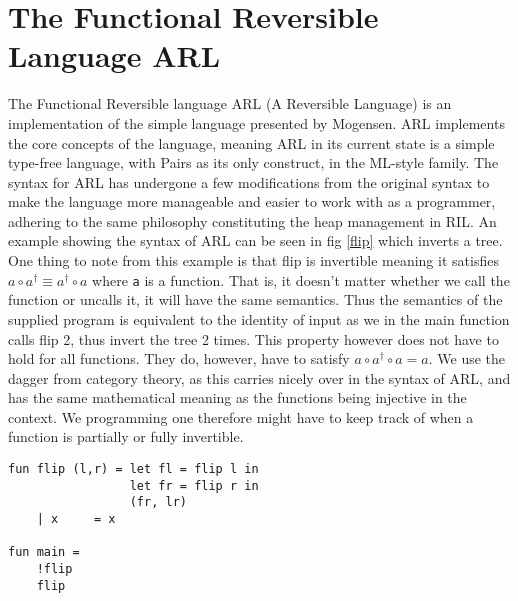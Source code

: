 \documentclass[a4paper]{article}
\begin{document}
\section{The Functional Reversible Language ARL}
\label{sec:org2895534}
The Functional Reversible language ARL (A Reversible Language) is an
implementation of the simple language presented by Mogensen\cite{Mogensen2018ReversibleGC}. ARL implements the core concepts of the language, meaning ARL in its current state is a simple type-free language, with Pairs as its only construct, in the ML-style family. The syntax for ARL has undergone a few modifications from the original syntax to make
the language more manageable and easier to work with as a programmer, adhering to
the same philosophy constituting the heap management in RIL. An example showing the syntax of ARL can be seen in fig \ref{flip} which inverts a tree. One thing to note from this example is
that flip is invertible meaning it satisfies \(a \circ a^{\dag} \equiv a^{\dag} \circ a\) where \texttt{a} is a function.
That is, it doesn't matter whether we call the function or uncalls it, it will have the same semantics. Thus the semantics of the supplied program is equivalent to the identity of input as we in the main function calls flip 2, thus invert the tree 2 times. This property however does not have to hold for all functions. They do, however, have to satisfy \(a \circ a^{\dag} \circ a = a\). We use the dagger from category theory, as this carries nicely over in the syntax of ARL, and has the same mathematical meaning as the functions being injective in the context. We programming one therefore might have to keep track of when a function is partially or fully invertible.

\begin{verbatim}
fun flip (l,r) = let fl = flip l in
                 let fr = flip r in
                 (fr, lr)
    | x     = x

fun main =
    !flip
    flip
\end{verbatim}
\end{document}
